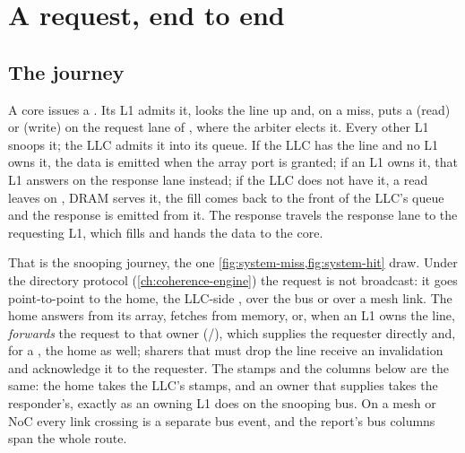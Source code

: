 \chapter{A request, end to end}\label{ch:request-end-to-end}


\section{The journey}

A core issues a . Its L1 admits it, looks the line up and, on a miss, puts a
 (read) or  (write) on the request lane of , where the arbiter
elects it. Every other L1 snoops it; the LLC admits it into its queue. If the LLC has the line
and no L1 owns it, the data is emitted when the array port is granted; if an L1 owns it, that
L1 answers on the response lane instead; if the LLC does not have it, a read leaves on
, DRAM serves it, the fill comes back to the front of the LLC's queue and the
response is emitted from it. The response travels the response lane to the requesting L1, which
fills and hands the data to the core.

That is the snooping journey, the one \cref{fig:system-miss,fig:system-hit} draw. Under the
directory protocol (\cref{ch:coherence-engine}) the request is not broadcast: it goes
point-to-point to the home, the LLC-side , over the bus or over a
mesh link. The home answers from its array, fetches from memory, or, when an L1 owns the line,
\emph{forwards} the request to that owner (/), which supplies the
requester directly and, for a , the home as well; sharers that must drop the line
receive an invalidation and acknowledge it to the requester. The stamps and the columns below are
the same: the home takes the LLC's stamps, and an owner that supplies takes the responder's,
exactly as an owning L1 does on the snooping bus. On a mesh or NoC every link crossing is a
separate bus event, and the report's bus columns span the whole route.

